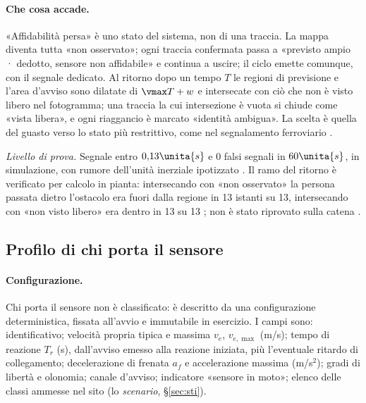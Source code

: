 \paragraph{Che cosa accade.} «Affidabilità persa» è uno stato del sistema, non di una traccia. La mappa diventa tutta «non osservato»; ogni traccia confermata passa a «previsto ampio · dedotto, sensore non affidabile» e continua a uscire; il ciclo emette comunque, con il segnale dedicato. Al ritorno dopo un tempo $T$ le regioni di previsione e l'area d'avviso sono dilatate di $\vmax T+w$ e intersecate con ciò che non è visto libero nel fotogramma; una traccia la cui intersezione è vuota si chiude come «vista libera», e ogni riaggancio è marcato «identità ambigua». La scelta è quella del guasto verso lo stato più restrittivo, come nel segnalamento ferroviario \cite{us-49cfr-236-205}.

\emph{Livello di prova.} Segnale entro $0{,}13\unita{s}$ e 0 falsi segnali in $60\unita{s}$, in simulazione, con rumore dell'unità inerziale ipotizzato . Il ramo del ritorno è verificato per calcolo in pianta: intersecando con «non osservato» la persona passata dietro l'ostacolo era fuori dalla regione in 13 istanti su 13, intersecando con «non visto libero» era dentro in 13 su 13 ; non è stato riprovato sulla catena .

\subsection{Profilo di chi porta il sensore}\label{sec:lim-portatore}

\paragraph{Configurazione.} Chi porta il sensore non è classificato: è descritto da una configurazione deterministica, fissata all'avvio e immutabile in esercizio. I campi sono: identificativo; velocità propria tipica e massima $v_e$, $v_{e,\max}$ (m/s); tempo di reazione $T_r$ (s), dall'avviso emesso alla reazione iniziata, più l'eventuale ritardo di collegamento; decelerazione di frenata $a_f$ e accelerazione massima (m/s$^2$); gradi di libertà e olonomia; canale d'avviso; indicatore «sensore in moto»; elenco delle classi ammesse nel sito (lo \emph{scenario}, \S\ref{sec:sti}).

